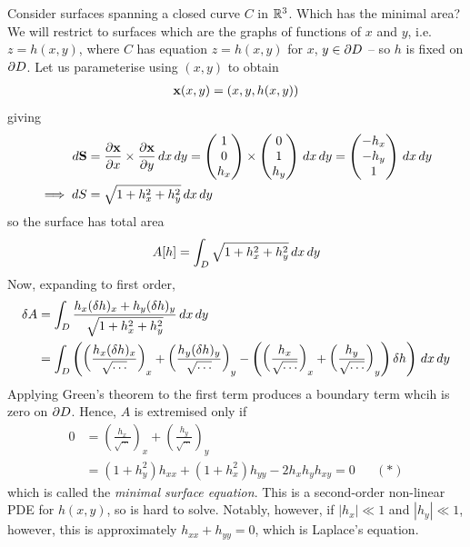 \documentclass{../../template/note}
\begin{document}
    Consider surfaces spanning a closed curve $C$ in $\mathbb R^3$. Which has the minimal area? We will restrict to surfaces which are the graphs of functions of $x$ and $y$, i.e. $z = h(x, y)$, where $C$ has equation $z = h(x, y)$ for $x$, $y \in \partial D$ -- so $h$ is fixed on $\partial D$. Let us parameterise using $(x, y)$ to obtain
    \begin{align*}
        \V x(x, y) = (x, y, h(x,y)) 
    \end{align*}
    giving
    \begin{align*}
        d \V S &= \pd{\V x}{x} \times \pd{\V x}{y} \D x \D y = \begin{pmatrix}
            1 \\
            0 \\
            h_x \\
        \end{pmatrix} \times \begin{pmatrix}
            0 \\
            1 \\
            h_y \\
        \end{pmatrix}\D x \D y = \begin{pmatrix}
            -h_x \\
            -h_y \\
            1 \\
        \end{pmatrix} \D x \D y \\
        \implies dS &= \sqrt{1+h_x^2+h_y^2} \D x \D y
    \end{align*}
    so the surface has total area
    \begin{align*}
        A[h] = \int_D \sqrt{1+h_x^2+h_y^2} \,d{x} \,d{y}
    \end{align*}
    Now, expanding to first order,
    \begin{align*}
        \delta A &= \int_D \frac{h_x(\delta h)_x + h_y(\delta h)_y}{\sqrt{1+h_x^2+h_y^2}} \,d{x} \,d{y} \\
        &= \int_D \left(\left(\frac{h_x(\delta h)_x}{\sqrt{\cdots}}\right)_x + \left(\frac{h_y(\delta h)_y}{\sqrt{\cdots}}\right)_y - \left(\left(\frac{h_x}{\sqrt{\cdots}}\right)_x + \left(\frac{h_y}{\sqrt{\cdots}}\right)_y\right)\delta h\right)\,d{x} \,d{y}
    \end{align*}
    Applying Green's theorem to the first term produces a boundary term whcih is zero on $\partial D$. Hence, $A$ is extremised only if
    \begin{align*}
        0 &= \left(\frac{h_x}{\sqrt{\cdots}}\right)_x + \left(\frac{h_y}{\sqrt{\cdots}}\right)_y \\
        &= (1+h_y^2) h_{xx} + (1+h_x^2) h_{yy} - 2h_xh_yh_{xy} = 0 && (*)
    \end{align*}
    which is called the \emph{minimal surface equation}. This is a second-order non-linear PDE for $h(x, y)$, so is hard to solve. Notably, however, if $|h_x| \ll 1$ and $|h_y| \ll 1$, however, this is approximately $h_{xx} + h_{yy} = 0$, which is Laplace's equation.
    
\end{document}
